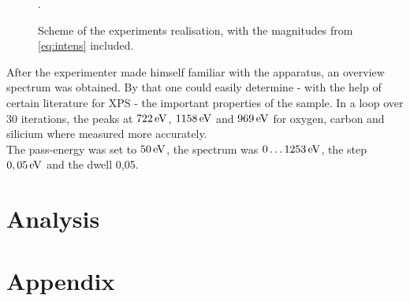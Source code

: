 \documentclass[numbers=noenddot,a4paper,notitlepage,twoside,BCOR15mm]{article}
\begin{document}
			\begin{figure}[h]
				\centering
				\caption{Scheme of the experiments realisation, with the magnitudes from \autoref{eq:intens} included. \cite{XPSRapha}}.
				\label{img:aufbau}
			\end{figure}

		After the experimenter made himself familiar with the apparatus, an overview spectrum was obtained. By that one could easily determine - with the help of certain literature for XPS - the important properties of the sample. In a loop over 30 iterations, the peaks at $\unit[722]{eV}$, $\unit[1158]{eV}$ and $\unit[969]{eV}$ for oxygen, carbon and silicium where measured more accurately.\\
		The pass-energy was set to $\unit[50]{eV}$, the spectrum was $\unit[0\dots1253]{eV}$, the step $\unit[0,05]{eV}$ and the dwell 0,05.

	\clearpage
	\section{Analysis}
	
	\clearpage
	\section{Appendix}

		
		
\end{document}
